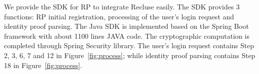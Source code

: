 We provide the SDK for RP to integrate Recluse easily. The SDK provides 3 functions:  RP initial registration, processing of the user's login request and  identity proof parsing. The Java SDK is implemented based on the Spring Boot framework  with about 1100 lines JAVA code. The cryptographic computation is completed through Spring Security library. The user's login request contains Step 2, 3, 6, 7 and 12 in Figure~\ref{fig:process}; while  identity proof parsing contains Step 18 in Figure~\ref{fig:process}.

\begin{comment}
\noindent\textbf{Cross-Origin Resource Sharing (CORS).} The chrome extension needs to construct cross-origin requests to communicate with the RP and IdP, which is forbidden by default by the same-origin security policy. Recluse adopts CORS to achieve this cross-origin communication. In details, we requires the RP and IdP to specify \verb+chrome-extension://chrome-id+ in the \verb+Access-Control-Allow-Origin+ field of its response header, which makes the request pass the permission checks at the browser. As \verb+chrome-id+ is unique assigned by the Google, no other (malicious) entity can perform the cross-origin communication.





In this section, we firstly illustrate the parameters requirement in Recluse. After, we describe how the prototype is built.

\subsection{Parameters Requirement}
The $SK_Cert$, $PK_CERT$, $SK_ID$ and $PK_ID$ are two pairs of 2048-bit RSA key for different modulus. The $P$ is the 2048-bit strong prime number, as $(P-1)/2$ is also a prime number. And the $g$ is the smallest primitive root of $P$. The $RPID_O$ is another primitive root of $P$ generated from $g$. The $n_u$, $n_RP$ and $UID$ are required 256-bit odd numbers, which satisfies the security consideration about Discrete Logarithm problem.


\end{comment}
